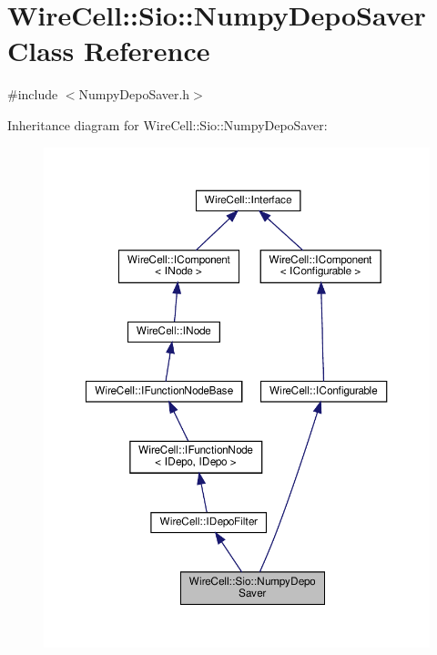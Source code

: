 \hypertarget{class_wire_cell_1_1_sio_1_1_numpy_depo_saver}{}\section{Wire\+Cell\+:\+:Sio\+:\+:Numpy\+Depo\+Saver Class Reference}
\label{class_wire_cell_1_1_sio_1_1_numpy_depo_saver}


{\ttfamily \#include $<$Numpy\+Depo\+Saver.\+h$>$}



Inheritance diagram for Wire\+Cell\+:\+:Sio\+:\+:Numpy\+Depo\+Saver\+:
\nopagebreak
\begin{figure}[H]
\begin{center}
\leavevmode
\includegraphics[width=350pt]{class_wire_cell_1_1_sio_1_1_numpy_depo_saver__inherit__graph}
\end{center}
\end{figure}


